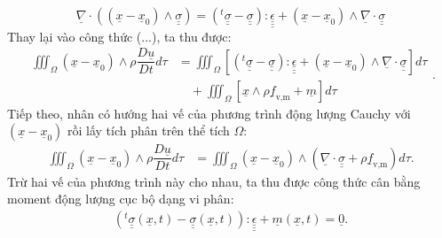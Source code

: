 \documentclass[../../../main.tex]{subfiles}
\begin{document}
		\[
			\underline{\nabla}\cdot\left(\left(\underline{x}-\underline{x}_0\right)\wedge\underline{\underline{\sigma}}\right)=\left({}^t\underline{\underline{\sigma}}-\underline{\underline{\sigma}}\right)\colon\underline{\underline{\underline{\epsilon}}}+\left(\underline{x}-\underline{x}_0\right)\wedge\underline{\nabla}\cdot\underline{\underline{\sigma}}
		\]
	Thay lại vào công thức (...), ta thu được:
		\[
			\begin{aligned}	
				\iiint_{\Omega}\left(\underline{x}-\underline{x}_0\right)\wedge\rho\dfrac{D\underline{u}}{Dt}d\tau&=\iiint_{\Omega}\left[\left({}^t\underline{\underline{\sigma}}-\underline{\underline{\sigma}}\right)\colon\underline{\underline{\underline{\epsilon}}}+\left(\underline{x}-\underline{x}_0\right)\wedge\underline{\nabla}\cdot\underline{\underline{\sigma}}\right]d\tau\\
				&\quad+\iiint_{\Omega}\left[\underline{x}\wedge\rho\underline{f}_{\text{v,m}}+\underline{m}\right]d\tau
			\end{aligned}.
		\]
	Tiếp theo, nhân có hướng hai vế của phương trình động lượng Cauchy với $\left(\underline{x}-\underline{x}_0\right)$ rồi lấy tích phân trên thể tích $\Omega$:
		\[
			\begin{aligned}
				\iiint_{\Omega}\left(\underline{x}-\underline{x}_0\right)\wedge\rho\dfrac{D\underline{u}}{Dt}d\tau&=\iiint_{\Omega}\left(\underline{x}-\underline{x}_0\right)\wedge\left(\underline{\nabla}\cdot\underline{\underline{\sigma}}+\rho\underline{f}_{\text{v,m}}\right)d\tau.
			\end{aligned}
		\]
	Trừ hai vế của phương trình này cho nhau, ta thu được công thức cân bằng moment động lượng cục bộ dạng vi phân:
		\begin{align}
			\boxed{\left({}^t\underline{\underline{\sigma}}\left(\underline{x},t\right)-\underline{\underline{\sigma}}\left(\underline{x},t\right)\right)\colon\underline{\underline{\underline{\epsilon}}}+\underline{m}\left(\underline{x},t\right)=\underline{0}}.
		\end{align}
	
\end{document}
